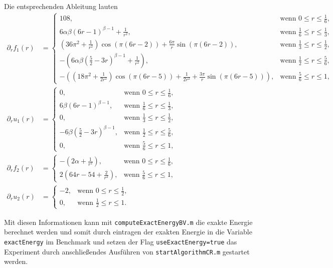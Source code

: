 Die entsprechenden Ableitung lauten
\begin{align*}
  \partial_r f_1(r) &= 
  \begin{cases}
    108,&\text{wenn }0\leq r\leq\frac{1}{6},\\
    6\alpha\beta(6r-1)^{\beta-1} +\frac{1}{r^2}, &
    \text{wenn } \frac{1}{6}\leq r\leq\frac{1}{3},\\
    (36\pi^2+\frac{1}{r^2})\cos(\pi(6r-2))+
    \frac{6\pi}{r}\sin(\pi(6r-2)), &
    \text{wenn } \frac{1}{3}\leq r\leq\frac{1}{2},\\
    -\left(6\alpha\beta\left( \frac{5}{2}-3r \right)^{\beta-1}+
    \frac{1}{r^2}\right),&
    \text{wenn } \frac{1}{2}\leq r\leq\frac{5}{6},\\
    -\left( \left( 18\pi^2+\frac{1}{2r^2} \right)\cos(\pi(6r-5))+ 
    \frac{1}{2r^2}+\frac{3\pi}{r}\sin(\pi(6r-5))\right),&
    \text{wenn } \frac{5}{6}\leq r\leq 1,
  \end{cases}\\
  \partial_r u_1(r) &= 
  \begin{cases}
    0,&\text{wenn }0\leq r\leq\frac{1}{6},\\
    6\beta(6r-1)^{\beta-1}, &\text{wenn } \frac{1}{6}\leq r\leq\frac{1}{3},\\
    0, &\text{wenn } \frac{1}{3}\leq r\leq\frac{1}{2},\\
    -6\beta\left( \frac{5}{2}-3r \right)^{\beta-1},&
    \text{wenn } \frac{1}{2}\leq r\leq\frac{5}{6},\\
    0,&\text{wenn } \frac{5}{6}\leq r\leq 1,
  \end{cases}\\
  \partial_r f_2(r) &= 
  \begin{cases}
    -\left( 2\alpha +\frac{1}{r^2} \right),&\text{wenn }0\leq r\leq\frac{1}{6},\\
    2\left( 64r-54+\frac{2}{r^2} \right),&
    \text{wenn } \frac{5}{6}\leq r\leq 1,
  \end{cases}\\
  \partial_r u_2(r) &= 
  \begin{cases}
    -2,&\text{wenn }0\leq r\leq\frac{1}{2},\\
    0,&\text{wenn } \frac{1}{2}\leq r\leq 1.
  \end{cases}
\end{align*}

Mit diesen Informationen kann mit \texttt{computeExactEnergyBV.m} die exakte 
Energie berechnet werden und somit durch eintragen der exakten Energie
in die Variable \texttt{exactEnergy} im Benchmark und setzen der Flag
\texttt{useExactEnergy=true} das Experiment durch anschließendes Ausführen
von \texttt{startAlgorithmCR.m} gestartet werden.
